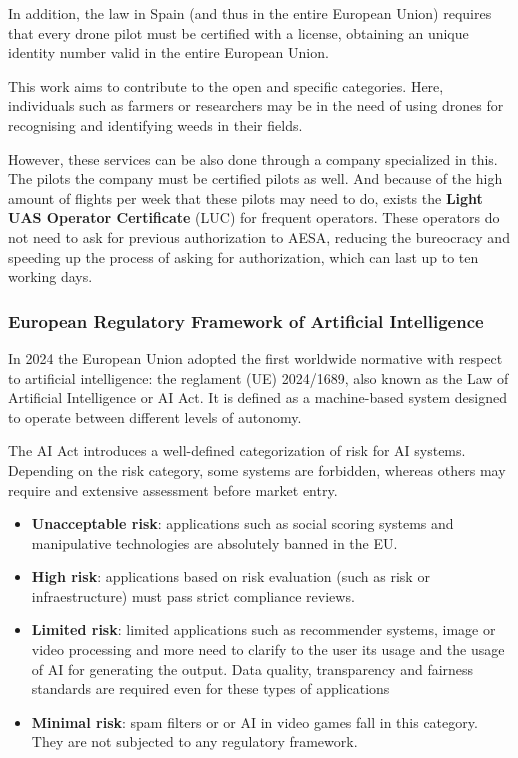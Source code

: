 \documentclass[12pt]{report} %
\begin{document}
In addition, the law in Spain (and thus in the entire European Union) requires that every drone pilot must be certified with a license, obtaining an unique identity number valid in the entire European Union.

This work aims to contribute to the open and specific categories. Here, individuals such as farmers or researchers may be in the need of using drones for recognising and identifying weeds in their fields. 

However, these services can be also done through a company specialized in this. The pilots the company must be certified pilots as well. And because of the high amount of flights per week that these pilots may need to do, exists the \textbf{Light UAS Operator Certificate} (LUC) for frequent operators. These operators do not need to ask for previous authorization to AESA, reducing the bureocracy and speeding up the process of asking for authorization, which can last up to ten working days. 

\subsubsection{European Regulatory Framework of Artificial Intelligence}

In 2024 the European Union adopted the first worldwide normative with respect to artificial intelligence: the reglament (UE) 2024/1689, also known as the Law of Artificial Intelligence or AI Act. It is defined as a machine-based system designed to operate between different levels of autonomy. 

The AI Act introduces a well-defined categorization of risk for AI systems. Depending on the risk category, some systems are forbidden, whereas others may require and extensive assessment before market entry.

\begin{itemize}
	
	\item \textbf{Unacceptable risk}: applications such as social scoring systems and manipulative technologies are absolutely banned in the EU. 
	\item \textbf{High risk}: applications based on risk evaluation (such as risk or infraestructure) must pass strict compliance reviews.
	\item \textbf{Limited risk}: limited applications such as recommender systems, image or video processing and more need to clarify to the user its usage and the usage of AI for generating the output. Data quality, transparency and fairness standards are required even for these types of applications  
	\item \textbf{Minimal risk}: spam filters or or AI in video games fall in this category. They are not subjected to any regulatory framework.

\end{itemize}
\end{document}
